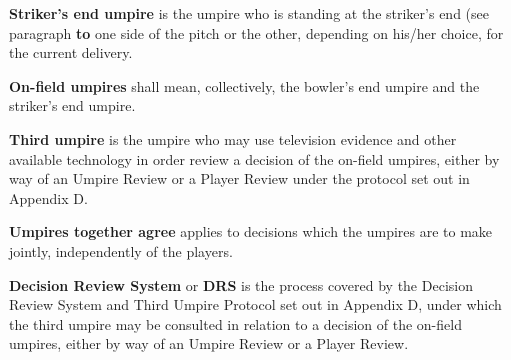 \documentclass[12pt]{article}
\begin{document}
\vspace{\baselineskip}
\begin{adjustwidth}{0.4in}{0.03in}
\begin{justify}
{\fontsize{9pt}{10.8pt} \tabto{0.39in} \textbf{Striker’s end umpire }is the umpire who is standing at the striker’s end (see paragraph\textbf{ to }one side of the\textbf{ }pitch or the other, depending on his/her choice, for the current delivery.\par}
\end{justify}\par

\end{adjustwidth}


\vspace{\baselineskip}
{\fontsize{9pt}{10.8pt} \tabto{0.39in} \textbf{On-field umpires }shall mean, collectively, the bowler’s end umpire and the striker’s end umpire.\par}\par


\vspace{\baselineskip}
\begin{adjustwidth}{0.4in}{0.04in}
\begin{justify}
{\fontsize{9pt}{10.8pt} \tabto{0.39in} \textbf{Third umpire }is the umpire who may use television evidence and other available technology in order review a\textbf{ }decision of the on-field umpires, either by way of an Umpire Review or a Player Review under the protocol set out in Appendix D.\par}
\end{justify}\par

\end{adjustwidth}


\vspace{\baselineskip}
\begin{adjustwidth}{0.4in}{0.29in}
{\fontsize{9pt}{10.8pt} \tabto{0.39in} \textbf{Umpires together agree }applies to decisions which the umpires are to make jointly, independently of the\textbf{ }players.\par}\par

\end{adjustwidth}


\vspace{\baselineskip}
\begin{adjustwidth}{0.4in}{0.1in}
\begin{justify}
{\fontsize{9pt}{10.8pt} \tabto{0.39in} \textbf{Decision Review System }or\textbf{ DRS }is the process covered by the Decision Review System and Third Umpire\textbf{ }Protocol set out in Appendix D, under which the third umpire may be consulted in relation to a decision of the on-field umpires, either by way of an Umpire Review or a Player Review.\par}
\end{justify}\par

\end{adjustwidth}
\end{document}
